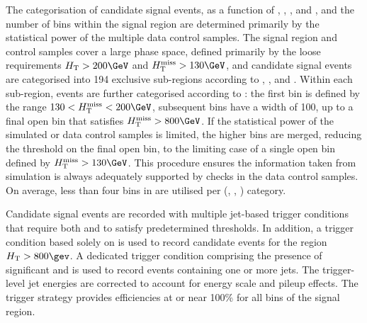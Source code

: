 The categorisation of candidate signal events, as a function of \njet,
\nb, \scalht, and \HTmiss, and the number of bins within the signal
region are determined primarily by the statistical power of the
multiple data control samples. The signal region and control samples
cover a large phase space, defined primarily by the loose requirements
$\scalht > 200\GeV$ and $\HTmiss > 130\GeV$, and candidate signal
events are categorised into 194 exclusive sub-regions according to
\njet, \nb, and \scalht. Within each sub-region, events are further
categorised according to \HTmiss: the first bin is defined by the
range $130 < \HTmiss < 200\GeV$, subsequent bins have a width of
100\GeV, up to a final open bin that satisfies $\HTmiss > 800\GeV$. If
the statistical power of the simulated or data control samples is
limited, the higher \HTmiss bins are merged, reducing the threshold on
the final open bin, to the limiting case of a single open bin defined
by $\HTmiss > 130\GeV$. This procedure ensures the information taken
from simulation is always adequately supported by checks in the data
control samples. On average, less than four bins in \HTmiss are
utilised per (\njet, \nb, \scalht) category.

Candidate signal events are recorded with multiple jet-based trigger
conditions that require both \scalht and \alphat to satisfy
predetermined thresholds. In addition, a trigger condition based
solely on \scalht is used to record candidate events for the region
$\scalht > 800\gev$. A dedicated trigger condition comprising the
presence of significant \mht and \ETmiss is used to record events
containing one or more jets. The trigger-level jet energies are
corrected to account for energy scale and pileup effects. The trigger
strategy provides efficiencies at or near 100\% for all bins of the
signal region.
